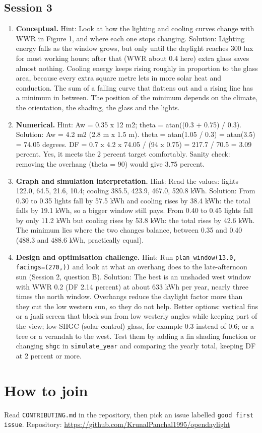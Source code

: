 \documentclass[11pt,a4paper]{article}
\begin{document}
\subsection*{Session 3}
\begin{enumerate}[nosep]
\item \textbf{Conceptual.} Hint: Look at how the lighting and cooling curves change with WWR in Figure 1, and where each one stops changing. Solution: Lighting energy falls as the window grows, but only until the daylight reaches 300 lux for most working hours; after that (WWR about 0.4 here) extra glass saves almost nothing. Cooling energy keeps rising roughly in proportion to the glass area, because every extra square metre lets in more solar heat and conduction. The sum of a falling curve that flattens out and a rising line has a minimum in between. The position of the minimum depends on the climate, the orientation, the shading, the glass and the lights.
\item \textbf{Numerical.} Hint: Aw = 0.35 x 12 m2; theta = atan((0.3 + 0.75) / 0.3). Solution: Aw = 4.2 m2 (2.8 m x 1.5 m). theta = atan(1.05 / 0.3) = atan(3.5) = 74.05 degrees. DF = 0.7 x 4.2 x 74.05 / (94 x 0.75) = 217.7 / 70.5 = 3.09 percent. Yes, it meets the 2 percent target comfortably. Sanity check: removing the overhang (theta = 90) would give 3.75 percent.
\item \textbf{Graph and simulation interpretation.} Hint: Read the values: lights 122.0, 64.5, 21.6, 10.4; cooling 385.5, 423.9, 467.0, 520.8 kWh. Solution: From 0.30 to 0.35 lights fall by 57.5 kWh and cooling rises by 38.4 kWh: the total falls by 19.1 kWh, so a bigger window still pays. From 0.40 to 0.45 lights fall by only 11.2 kWh but cooling rises by 53.8 kWh: the total rises by 42.6 kWh. The minimum lies where the two changes balance, between 0.35 and 0.40 (488.3 and 488.6 kWh, practically equal).
\item \textbf{Design and optimisation challenge.} Hint: Run \texttt{plan\_window(13.0, facings=(270,))} and look at what an overhang does to the late-afternoon sun (Session 2, question B). Solution: The best is an unshaded west window with WWR 0.2 (DF 2.14 percent) at about 633 kWh per year, nearly three times the north window. Overhangs reduce the daylight factor more than they cut the low western sun, so they do not help. Better options: vertical fins or a jaali screen that block sun from low westerly angles while keeping part of the view; low-SHGC (solar control) glass, for example 0.3 instead of 0.6; or a tree or a verandah to the west. Test them by adding a fin shading function or changing \texttt{shgc} in \texttt{simulate\_year} and comparing the yearly total, keeping DF at 2 percent or more.
\end{enumerate}

\section{How to join}
Read \texttt{CONTRIBUTING.md} in the repository, then pick an issue labelled \texttt{good first issue}. Repository: \url{https://github.com/KrunalPanchal1995/opendaylight}
\end{document}
